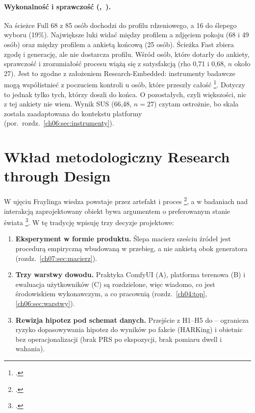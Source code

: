 \paragraph{Wykonalność i sprawczość (,~).}
Na ścieżce Full 68 z 85 osób dochodzi do profilu rdzeniowego, a 16 do ślepego wyboru (19\%). Największe luki widać między profilem a zdjęciem pokoju (68 i 49 osób) oraz między profilem a ankietą końcową (25 osób). Ścieżka Fast zbiera zgodę i generację, ale nie dostarcza profilu.
Wśród osób, które dotarły do ankiety, sprawczość i zrozumiałość procesu wiążą się z satysfakcją (rho 0,71 i 0,68, $n$ około 27). Jest to zgodne z założeniem Research-Embedded: instrumenty badawcze mogą współistnieć z poczuciem kontroli u osób, które przeszły całość \footcite{zimmerman2007rtd}. Dotyczy to jednak tylko tych, którzy doszli do końca. O pozostałych, czyli większości, nic z tej ankiety nie wiem.
Wynik SUS (66,48, $n=27$) czytam ostrożnie, bo skala została zaadaptowana do kontekstu platformy (por.\ rozdz.~\ref{ch06:sec:instrumenty}).

\section{Wkład metodologiczny Research through Design}
\label{ch09:sec:rtd}

W ujęciu Fraylinga wiedza powstaje przez artefakt i proces \footcite{frayling1993research}, a w badaniach nad interakcją zaprojektowany obiekt bywa argumentem o preferowanym stanie świata \footcite{zimmerman2007rtd}.
W tę tradycję wpisuję trzy decyzje projektowe:

\begin{enumerate}
  \item \textbf{Eksperyment w formie produktu.} Ślepa macierz sześciu źródeł jest procedurą empiryczną wbudowaną w przebieg, a nie ankietą obok generatora (rozdz.~\ref{ch07:sec:macierz}).
  \item \textbf{Trzy warstwy dowodu.} Praktyka ComfyUI (A), platforma terenowa (B) i ewaluacja użytkowników (C) są rozdzielone, więc wiadomo, co jest środowiskiem wykonawczym, a co pracownią (rozdz.~\ref{ch04:top}, \ref{ch06:sec:warstwy}).
  \item \textbf{Rewizja hipotez pod schemat danych.} Przejście z H1--H5 do -- ogranicza ryzyko dopasowywania hipotez do wyników po fakcie (HARKing) i obietnic bez operacjonalizacji (brak PRS po ekspozycji, brak pomiaru dwell i wahania).
\end{enumerate}

